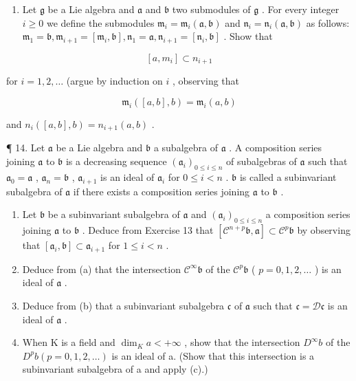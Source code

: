 \begin{enumerate}
\def\labelenumi{\arabic{enumi}.}
\setcounter{enumi}{12}
\tightlist
\item
  Let \(\mathfrak{g}\) be a Lie algebra and \(\mathfrak{a}\) and \(\mathfrak{b}\) two submodules of \(\mathfrak{g}\) . For every integer \(i \geqslant 0\) we define the submodules \(\mathfrak{m}_i = \mathfrak{m}_i(\mathfrak{a},\mathfrak{b})\) and \(\mathfrak{n}_i = \mathfrak{n}_i(\mathfrak{a},\mathfrak{b})\) as follows: \(\mathfrak{m}_1 = \mathfrak{b}, \mathfrak{m}_{i+1} = [\mathfrak{m}_i,\mathfrak{b}], \mathfrak{n}_1 = \mathfrak{a}, \mathfrak{n}_{i+1} = [\mathfrak{n}_i,\mathfrak{b}]\) . Show that
\end{enumerate}

\[
[ a, m _ {i} ] \subset n _ {i + 1}
\]

for \(i = 1,2,\ldots\) (argue by induction on \(i\) , observing that

\[
\mathfrak {m} _ {i} ([ a, b ], b) = \mathfrak {m} _ {i} (a, b)
\]

and \(n_{i}([a,b],b)=n_{i+1}(a,b)\) .

¶ 14. Let \(\mathfrak{a}\) be a Lie algebra and \(\mathfrak{b}\) a subalgebra of \(\mathfrak{a}\) . A composition series joining \(\mathfrak{a}\) to \(\mathfrak{b}\) is a decreasing sequence \((\mathfrak{a}_i)_{0\leqslant i\leqslant n}\) of subalgebras of \(\mathfrak{a}\) such that \(\mathfrak{a}_0 = \mathfrak{a}\) , \(\mathfrak{a}_n = \mathfrak{b}\) , \(\mathfrak{a}_{i+1}\) is an ideal of \(\mathfrak{a}_i\) for \(0\leqslant i < n\) . \(\mathfrak{b}\) is called a subinvariant subalgebra of \(\mathfrak{a}\) if there exists a composition series joining \(\mathfrak{a}\) to \(\mathfrak{b}\) .

\begin{enumerate}
\def\labelenumi{(\alph{enumi})}
\item
  Let \(\mathfrak{b}\) be a subinvariant subalgebra of \(\mathfrak{a}\) and \((\mathfrak{a}_i)_{0\leqslant i\leqslant n}\) a composition series joining \(\mathfrak{a}\) to \(\mathfrak{b}\) . Deduce from Exercise 13 that \([\mathcal{C}^{n+p}\mathfrak{b},\mathfrak{a}]\subset\mathcal{C}^{p}\mathfrak{b}\) by observing that \([\mathfrak{a}_i,\mathfrak{b}]\subset\mathfrak{a}_{i+1}\) for \(1\leqslant i<n\) .
\item
  Deduce from (a) that the intersection \(\mathcal{C}^{\infty}\mathfrak{b}\) of the \(\mathcal{C}^{p}\mathfrak{b}\) ( \(p = 0,1,2,\ldots\) ) is an ideal of \(\mathfrak{a}\) .
\item
  Deduce from (b) that a subinvariant subalgebra \(\mathfrak{c}\) of \(\mathfrak{a}\) such that \(\mathfrak{c} = \mathcal{D}\mathfrak{c}\) is an ideal of \(\mathfrak{a}\) .
\item
  When K is a field and \(\dim_{K}a<+\infty\) , show that the intersection \(D^{\infty}b\) of the \(D^{p}b\left(p=0,1,2,\ldots\right)\) is an ideal of a. (Show that this intersection is a subinvariant subalgebra of a and apply (c).)
\end{enumerate}

